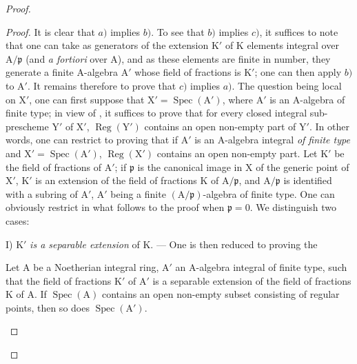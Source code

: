 \begin{proof}
\begin{proof}
It is clear that $a)$ implies $b)$. To see that $b)$ implies $c)$, it suffices to note
that one can take as generators of the extension $\mathrm{K}'$ of $\mathrm{K}$ elements integral over $\mathrm{A}/\mathfrak{p}$
(and \emph{a fortiori} over $\mathrm{A}$), and as these elements are finite in number, they generate a finite
$\mathrm{A}$-algebra $\mathrm{A}'$ whose field of fractions is $\mathrm{K}'$; one can then apply $b)$ to $\mathrm{A}'$.
It remains therefore to prove that $c)$ implies $a)$. The question being local on $\mathrm{X}'$, one can
first suppose that $\mathrm{X}'=\operatorname{Spec}(\mathrm{A}')$, where $\mathrm{A}'$ is an $\mathrm{A}$-algebra of finite type; in view of
, it suffices to prove that for every closed integral sub-prescheme $\mathrm{Y}'$
of $\mathrm{X}'$, $\operatorname{Reg}(\mathrm{Y}')$ contains an open non-empty part of $\mathrm{Y}'$. In other words, one can restrict
to proving that if $\mathrm{A}'$ is an $\mathrm{A}$-algebra integral \emph{of finite type} and $\mathrm{X}'=\operatorname{Spec}(\mathrm{A}')$,
$\operatorname{Reg}(\mathrm{X}')$ contains an open non-empty part. Let $\mathrm{K}'$ be the field of fractions of $\mathrm{A}'$;
if $\mathfrak{p}$ is the canonical image in $\mathrm{X}$ of the generic point of $\mathrm{X}'$, $\mathrm{K}'$ is an extension of the
field of fractions $\mathrm{K}$ of $\mathrm{A}/\mathfrak{p}$, and $\mathrm{A}/\mathfrak{p}$ is identified with a subring of $\mathrm{A}'$, $\mathrm{A}'$ being a finite
$(\mathrm{A}/\mathfrak{p})$-algebra of finite type. One can obviously restrict in what follows to the proof
when $\mathfrak{p}=0$. We distinguish two cases:

I) $\mathrm{K}'$ \emph{is a separable extension} of $\mathrm{K}$. --- One is then reduced to proving the

\begin{lemma}[6.12.4.1]
\label{IV.6.12.4.1}
Let $\mathrm{A}$ be a Noetherian integral ring, $\mathrm{A}'$ an $\mathrm{A}$-algebra integral
of finite type, such that the field of fractions $\mathrm{K}'$ of $\mathrm{A}'$ is a separable extension of the
field of fractions $\mathrm{K}$ of $\mathrm{A}$. If $\operatorname{Spec}(\mathrm{A})$ contains an open non-empty subset consisting of regular points, then
so does $\operatorname{Spec}(\mathrm{A}')$.
\end{lemma}


\end{proof}
\end{proof}
